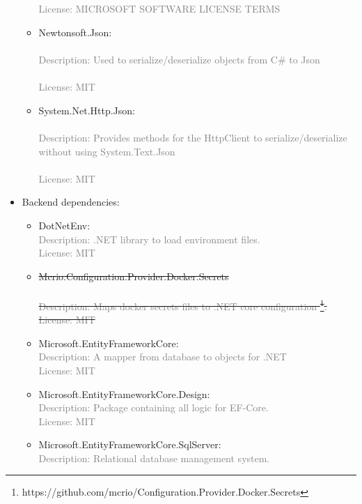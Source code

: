 \documentclass[10pt]{article}
\begin{document}
\begin{itemize}
\begin{itemize}
{        \\\\\textcolor{gray}{License: MICROSOFT SOFTWARE LICENSE TERMS}}
        \item Newtonsoft.Json:
        \\\\\textcolor{gray}{Description: Used to serialize/deserialize objects from C\# to Json}
        \\\\\textcolor{gray}{License: MIT}
        \item System.Net.Http.Json:
        \\\\\textcolor{gray}{Description: Provides methods for the HttpClient to serialize/deserialize without using System.Text.Json}
        \\\\\textcolor{gray}{License: MIT}
    \end{itemize}
    \item Backend dependencies:
    \begin{itemize}
        \item DotNetEnv:
        \\\textcolor{gray}{Description: .NET library to load environment files.}
        \\\textcolor{gray}{License: MIT}
        \item \sout{Mcrio.Configuration.Provider.Docker.Secrets \\
        \\\textcolor{gray}{Description: Maps docker secrets files to .NET core configuration \footnote{https://github.com/mcrio/Configuration.Provider.Docker.Secrets}.} 
        \\\textcolor{gray}{License: MIT}}
        \item Microsoft.EntityFrameworkCore:
        \\\textcolor{gray}{Description: A mapper from database to objects for .NET}
        \\\textcolor{gray}{License: MIT}
        \item Microsoft.EntityFrameworkCore.Design:
        \\\textcolor{gray}{Description: Package containing all logic for EF-Core. }
        \\\textcolor{gray}{License: MIT}
        \item Microsoft.EntityFrameworkCore.SqlServer:
        \\\textcolor{gray}{Description: Relational database management system.}

\end{itemize}
\end{itemize}
\end{document}

